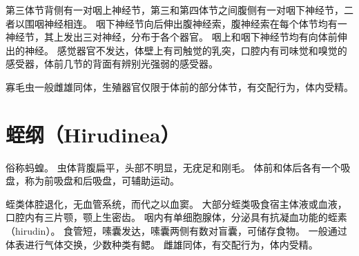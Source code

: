 \documentclass[11pt]{article}
\begin{document}
\newline

第三体节背侧有一对咽上神经节，第三和第四体节之间腹侧有一对咽下神经节，二者以围咽神经相连。
咽下神经节向后伸出腹神经索，腹神经索在每个体节均有一神经节，其上发出三对神经，分布于各个器官。
咽上和咽下神经节均有向体前伸出的神经。
感觉器官不发达，体壁上有司触觉的乳突，口腔内有司味觉和嗅觉的感受器，体前几节的背面有辨别光强弱的感受器。

\newline

寡毛虫一般雌雄同体，生殖器官仅限于体前的部分体节，有交配行为，体内受精。
  
\section{蛭纲（Hirudinea）}
俗称蚂蝗。
虫体背腹扁平，头部不明显，无疣足和刚毛。
体前和体后各有一个吸盘，称为前吸盘和后吸盘，可辅助运动。

\newline

蛭类体腔退化，无血管系统，而代之以血窦。
大部分蛭类吸食宿主体液或血液，口腔内有三片颚，颚上生密齿。
咽内有单细胞腺体，分泌具有抗凝血功能的蛭素（hirudin）。
食管短，嗉囊发达，嗉囊两侧有数对盲囊，可储存食物。
一般通过体表进行气体交换，少数种类有鳃。
雌雄同体，有交配行为，体内受精。
  
\end{document}
